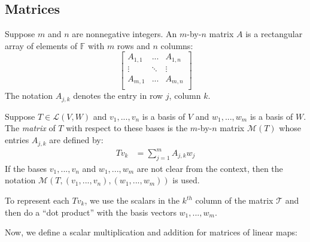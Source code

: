 \documentclass{article}
\begin{document}
\subsection{Matrices}

\begin{definition}
  \label{def:matrix}
  Suppose $m$ and $n$ are nonnegative integers. An $m$-by-$n$
  matrix $A$ is a rectangular array of elements of $\mathbb{F}$ with
  $m$ rows and $n$ columns:
  \[
    \begin{bmatrix}
      A_{1,1} & ... & A_{1,n} \\
      \vdots & \ddots & \vdots \\
      A_{m,1} & ... & A_{m,n} \\
    \end{bmatrix}
  \]
  The notation $A_{j,k}$ denotes the entry in row $j$, column $k$.
\end{definition}

\begin{definition}
  \label{def:matrix-of-linear-map}
  Suppose $T \in \mathcal{L}(V, W)$ and $v_1, ..., v_n$ is a basis of
  $V$ and $w_1, ..., w_m$ is a basis of $W$. The \textit{matrix} of
  $T$ with respect to these bases is the $m$-by-$n$ matrix
  $\mathcal{M}(T)$ whose entries $A_{j, k}$ are defined by:
  \begin{align*}
    Tv_k &= \sum_{j=1}^m A_{j, k}w_j
  \end{align*}
  If the bases $v_1, ..., v_n$ and $w_1, ..., w_m$ are not clear from
  the context, then the notation $\mathcal{M}(T, (v_1, ..., v_n),
  (w_1, ..., w_m))$ is used.
\end{definition}

\begin{remark}
  To represent each $Tv_k$, we use the scalars in the $k^{th}$ column
  of the matrix $\mathcal{T}$ and then do a ``dot product'' with the
  basis vectors $w_1, ..., w_m$.
\end{remark}

Now, we define a scalar multiplication and addition for matrices of
linear maps:
\end{document}
